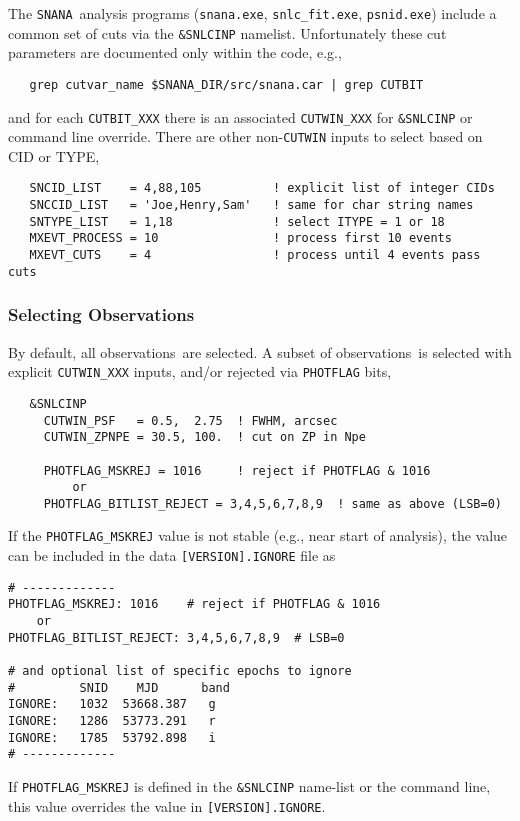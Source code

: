 \documentclass[12pt]{article}
\newcommand{\snana}{{\tt SNANA}}
\newcommand{\obss}{observations}
\begin{document}
The \snana\ analysis programs 
({\tt snana.exe}, {\tt snlc\_fit.exe}, {\tt psnid.exe})
include a common set of cuts via the {\tt \&SNLCINP} namelist.
Unfortunately these cut parameters are documented only within
the code, e.g.,
\begin{verbatim}                                                               
   grep cutvar_name $SNANA_DIR/src/snana.car | grep CUTBIT
\end{verbatim}
and for each {\tt CUTBIT\_XXX} there is an associated 
{\tt CUTWIN\_XXX} for {\tt \&SNLCINP} or command line override.
There are other non-{\tt CUTWIN} inputs to select based on CID or TYPE,
\begin{verbatim}
   SNCID_LIST    = 4,88,105          ! explicit list of integer CIDs
   SNCCID_LIST   = 'Joe,Henry,Sam'   ! same for char string names
   SNTYPE_LIST   = 1,18              ! select ITYPE = 1 or 18
   MXEVT_PROCESS = 10                ! process first 10 events
   MXEVT_CUTS    = 4                 ! process until 4 events pass cuts
\end{verbatim}


  \subsubsection{Selecting Observations}
  \label{sss:select_obs}

By default, all \obss\ are selected.
A subset of \obss\ is selected with explicit {\tt CUTWIN\_XXX} inputs,
and/or rejected via {\tt PHOTFLAG} bits,
\begin{verbatim} 
   &SNLCINP
     CUTWIN_PSF   = 0.5,  2.75  ! FWHM, arcsec
     CUTWIN_ZPNPE = 30.5, 100.  ! cut on ZP in Npe

     PHOTFLAG_MSKREJ = 1016     ! reject if PHOTFLAG & 1016
         or
     PHOTFLAG_BITLIST_REJECT = 3,4,5,6,7,8,9  ! same as above (LSB=0)
\end{verbatim}
%
If the {\tt PHOTFLAG\_MSKREJ} value is not stable 
(e.g., near start of analysis), the value can be included
in the data {\tt [VERSION].IGNORE} file as
%
\begin{verbatim}
# -------------
PHOTFLAG_MSKREJ: 1016    # reject if PHOTFLAG & 1016
    or
PHOTFLAG_BITLIST_REJECT: 3,4,5,6,7,8,9  # LSB=0

# and optional list of specific epochs to ignore
#         SNID    MJD      band
IGNORE:   1032  53668.387   g 
IGNORE:   1286  53773.291   r
IGNORE:   1785  53792.898   i
# -------------
\end{verbatim}
%
If {\tt PHOTFLAG\_MSKREJ} is defined in the {\tt \&SNLCINP} name-list
or the command line, this value overrides the value in {\tt [VERSION].IGNORE}.
\end{document}
